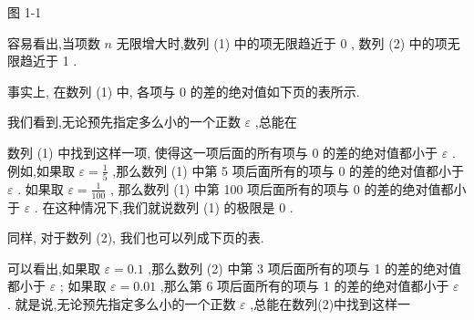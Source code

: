\documentclass[lang=cn,newtx,10pt,scheme=chinese]{elegantbook}
\begin{document}
图 1-1

容易看出,当项数 \(n\) 无限增大时,数列 (1) 中的项无限趋近于 0 , 数列 (2) 中的项无限趋近于 1 .

事实上, 在数列 (1) 中, 各项与 0 的差的绝对值如下页的表所示.

我们看到,无论预先指定多么小的一个正数 \(\varepsilon\) ,总能在

\begin{center}
\end{center}

数列 (1) 中找到这样一项, 使得这一项后面的所有项与 0 的差的绝对值都小于 \(\varepsilon\) . 例如,如果取 \(\varepsilon = \frac{1}{5}\) ,那么数列 (1) 中第 5 项后面所有的项与 0 的差的绝对值都小于 \(\varepsilon\) . 如果取 \(\varepsilon = \frac{1}{100}\) , 那么数列 (1) 中第 100 项后面所有的项与 0 的差的绝对值都小于 \(\varepsilon\) . 在这种情况下,我们就说数列 (1) 的极限是 0 .

同样, 对于数列 (2), 我们也可以列成下页的表.

可以看出,如果取 \(\varepsilon = {0.1}\) ,那么数列 (2) 中第 3 项后面所有的项与 1 的差的绝对值都小于 \(\varepsilon\) ; 如果取 \(\varepsilon = {0.01}\) ,那么第 6 项后面所有的项与 1 的差的绝对值都小于 \(\varepsilon\) . 就是说,无论预先指定多么小的一个正数 \(\varepsilon\) ,总能在数列(2)中找到这样一
\end{document}
